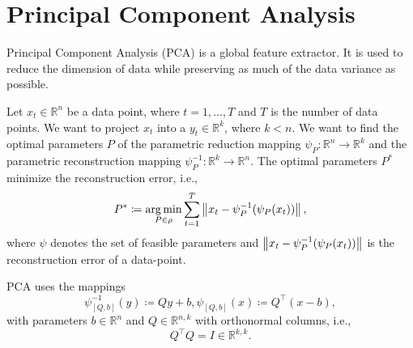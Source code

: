 \section{Principal Component Analysis}
Principal Component Analysis (PCA) is a global feature extractor. It is used to reduce the dimension of data while preserving as much of the data variance as possible.

Let $x_t \in \mathbb{R}^n$ be a data point, where $t=1,\dots,T$ and $T$ is the number of data points. We want to project $x_t$ into a $y_t \in \mathbb{R}^k$, where $k < n$. We want to find the optimal parameters $P$ of the parametric reduction mapping $\psi_P: \mathbb{R}^n \rightarrow \mathbb{R}^k$ and the parametric reconstruction mapping $\psi_P^{-1}: \mathbb{R}^k \rightarrow \mathbb{R}^n$. The optimal parameters $P^{*}$ minimize the reconstruction error, i.e.,
\begin{equation}
    P^{*} \coloneqq \operatorname*{arg\,min}_{P \in \rho} \sum_{t=1}^T \left\lVert x_t - \psi_P^{-1}(\psi_P(x_t))\right\rVert,
    \label{eq:mapping_optimization}
\end{equation}
where $\psi$ denotes the set of feasible parameters and $\left\lVert x_t - \psi_P^{-1}(\psi_P(x_t))\right\rVert$ is the reconstruction error of a data-point.

PCA uses the mappings
\begin{equation}
    \psi_{[Q,b]}^{-1}(y) \coloneqq Qy+b, \psi_{[Q,b]}(x) \coloneqq Q^{\top}(x-b),
    \label{eq:pca_mappings}
\end{equation}
with parameters $b \in \mathbb{R}^n$ and $Q \in \mathbb{R}^{n,k}$ with orthonormal columns, i.e.,
\begin{equation}
    Q^{\top}Q = I \in \mathbb{R}^{k,k}.
    \label{eq:pca_identity}
\end{equation}

